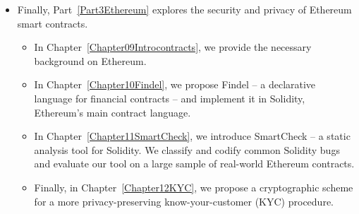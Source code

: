 \begin{itemize}
	\item
	Finally, Part~\ref{Part3Ethereum} explores the security and privacy of Ethereum smart contracts.
	\begin{itemize}
		\item 
	In Chapter~\ref{Chapter09Introcontracts}, we provide the necessary background on Ethereum.
		\item
	In Chapter~\ref{Chapter10Findel}, we propose Findel -- a declarative language for financial contracts -- and implement it in Solidity, Ethereum's main contract language.
		\item
	In Chapter~\ref{Chapter11SmartCheck}, we introduce SmartCheck -- a static analysis tool for Solidity.
	We classify and codify common Solidity bugs and evaluate our tool on a large sample of real-world Ethereum contracts.
		\item
	Finally, in Chapter~\ref{Chapter12KYC}, we propose a cryptographic scheme for a more privacy-preserving know-your-customer (KYC) procedure.
	\end{itemize}
\end{itemize}

